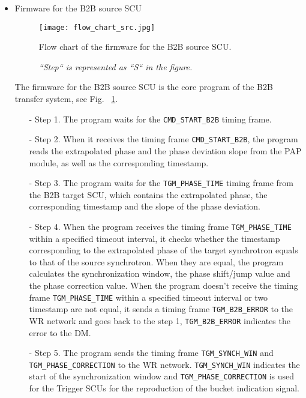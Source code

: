 \begin{itemize}
\item Firmware for the B2B source SCU
\begin{figure}[!htb]
   \centering   
   \texttt{[image: flow\_chart\_src.jpg]}
   \caption{Flow chart of the firmware for the B2B source SCU.}
   \caption*{\textsl{\small{``Step`` is represented as ``S`` in the figure.  }}}
   \label{flow_chart_src}
\end{figure}

The firmware for the B2B source SCU is the core program of the B2B transfer system, see Fig. ~\ref{flow_chart_src}. 

 	\begin{itemize}
		\item[-]Step 1. The program waits for the \verb|CMD_START_B2B| timing frame.
 		\item[-]Step 2. When it receives the timing frame \verb|CMD_START_B2B|, the program reads the extrapolated phase and the phase deviation slope from the PAP module, as well as the corresponding timestamp.
		\item[-]Step 3. The program waits for the \verb|TGM_PHASE_TIME| timing frame from the B2B target SCU, which contains the extrapolated phase, the corresponding timestamp and the slope of the phase deviation.
		\item[-]Step 4. When the program receives the timing frame \verb|TGM_PHASE_TIME| within a specified timeout interval, it checks whether the timestamp corresponding to the extrapolated phase of the target synchrotron equals to that of the source synchrotron. When they are equal, the program calculates the synchronization window, the phase shift/jump value and the phase correction value. When the program doesn't receive the timing frame \verb|TGM_PHASE_TIME| within a specified timeout interval or two timestamp are not equal, it sends a timing frame \verb|TGM_B2B_ERROR| to the WR network and goes back to the step 1, \verb|TGM_B2B_ERROR| indicates the error to the DM.  
		\item[-]Step 5. The program sends the timing frame \verb|TGM_SYNCH_WIN| and \verb|TGM_PHASE_CORRECTION| to the WR network. \verb|TGM_SYNCH_WIN| indicates the start of the synchronization window and \verb|TGM_PHASE_CORRECTION| is used for the Trigger SCUs for the reproduction of the bucket indication signal.

\end{itemize}
\end{itemize}
